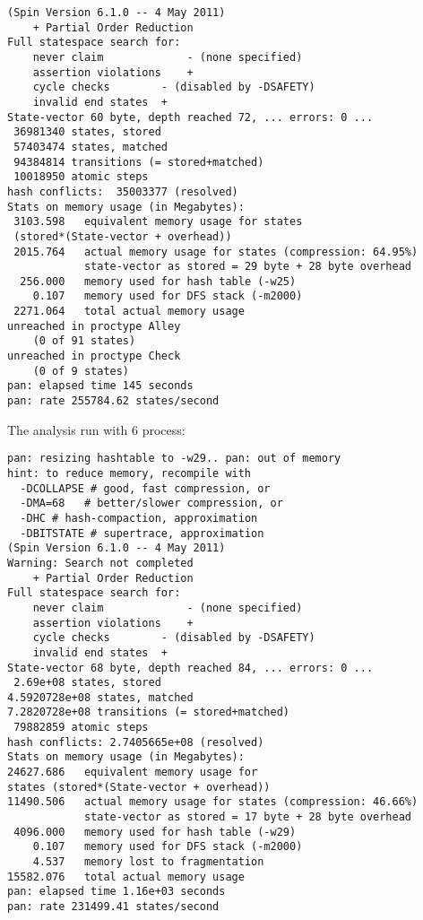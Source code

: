 \begin{lstlisting}
(Spin Version 6.1.0 -- 4 May 2011)
	+ Partial Order Reduction
Full statespace search for:
	never claim         	- (none specified)
	assertion violations	+
	cycle checks       	- (disabled by -DSAFETY)
	invalid end states	+
State-vector 60 byte, depth reached 72, ... errors: 0 ...
 36981340 states, stored
 57403474 states, matched
 94384814 transitions (= stored+matched)
 10018950 atomic steps
hash conflicts:  35003377 (resolved)
Stats on memory usage (in Megabytes):
 3103.598	equivalent memory usage for states 
 (stored*(State-vector + overhead))
 2015.764	actual memory usage for states (compression: 64.95%)
         	state-vector as stored = 29 byte + 28 byte overhead
  256.000	memory used for hash table (-w25)
    0.107	memory used for DFS stack (-m2000)
 2271.064	total actual memory usage
unreached in proctype Alley
	(0 of 91 states)
unreached in proctype Check
	(0 of 9 states)
pan: elapsed time 145 seconds
pan: rate 255784.62 states/second
\end{lstlisting}

The analysis run with 6 process:
\begin{lstlisting}
pan: resizing hashtable to -w29.. pan: out of memory
hint: to reduce memory, recompile with
  -DCOLLAPSE # good, fast compression, or
  -DMA=68   # better/slower compression, or
  -DHC # hash-compaction, approximation
  -DBITSTATE # supertrace, approximation
(Spin Version 6.1.0 -- 4 May 2011)
Warning: Search not completed
	+ Partial Order Reduction
Full statespace search for:
	never claim         	- (none specified)
	assertion violations	+
	cycle checks       	- (disabled by -DSAFETY)
	invalid end states	+
State-vector 68 byte, depth reached 84, ... errors: 0 ...
 2.69e+08 states, stored
4.5920728e+08 states, matched
7.2820728e+08 transitions (= stored+matched)
 79882859 atomic steps
hash conflicts: 2.7405665e+08 (resolved)
Stats on memory usage (in Megabytes):
24627.686	equivalent memory usage for 
states (stored*(State-vector + overhead))
11490.506	actual memory usage for states (compression: 46.66%)
         	state-vector as stored = 17 byte + 28 byte overhead
 4096.000	memory used for hash table (-w29)
    0.107	memory used for DFS stack (-m2000)
    4.537	memory lost to fragmentation
15582.076	total actual memory usage
pan: elapsed time 1.16e+03 seconds
pan: rate 231499.41 states/second
\end{lstlisting}